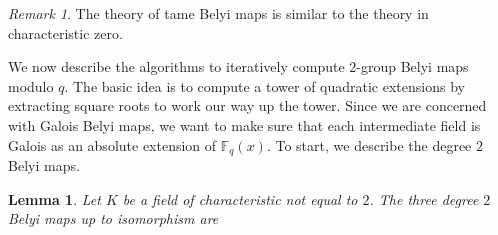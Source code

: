 \documentclass{dcthesis}
\newcommand{\PP}{\mathbb P}
\newcommand{\defi}[1]{\textsf{#1}}
\newcommand{\mm}[1]{{\color{blue} \sf MM: [#1]}}
\newcommand{\FF}{\mathbb{F}}
\DeclareMathOperator{\Mon}{Mon}
\numberwithin{equation}{section}
\newtheorem{lemma}[equation]{Lemma}
\theoremstyle{definition}
\newtheorem{definition}[equation]{Definition}
\theoremstyle{remark}
\newtheorem{remark}[equation]{Remark}
\begin{document}
{{{    \begin{remark}
      \label{rmk:tamebelyi}
      The theory of tame Belyi maps is
      similar to the theory in characteristic zero.
    \end{remark}
    We now describe the algorithms
    to iteratively compute $2$-group Belyi maps
    modulo $q$.
    The basic idea is to compute a tower
    of quadratic extensions
    by extracting square roots
    to work our way up the tower.
    Since we are concerned with Galois
    Belyi maps,
    we want to make sure
    that each intermediate field
    is Galois as an absolute extension
    of $\FF_q(x)$.
    To start,
    we describe
    the degree $2$ Belyi maps.
    \begin{lemma}
      \label{lem:degree2FF}
      Let $K$ be a field of characteristic not equal to $2$.
      The three degree $2$ Belyi maps
      up to isomorphism
      are
      \begin{equation}
        \label{eqn:degree2FF}

\end{equation}
\end{lemma}}}}
\end{document}
